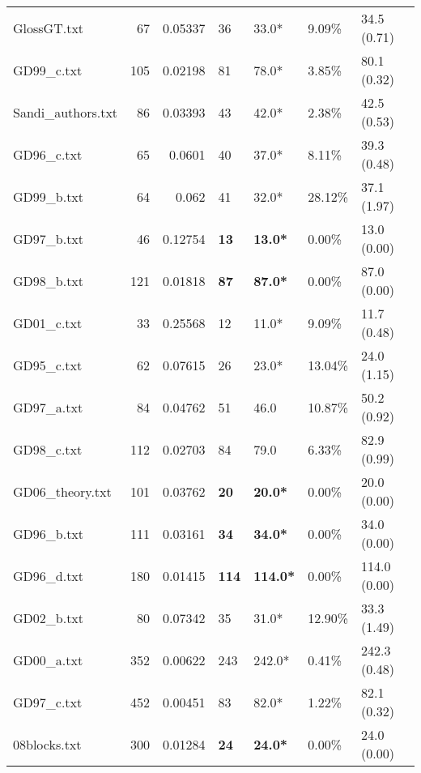 \begin{table}[h]
\begin{tabular}{lrrllll}
 GlossGT.txt        &      67 &     0.05337 & 36           & 33.0*           & 9.09\%   & 34.5 (0.71)    \\
 GD99_c.txt         &     105 &     0.02198 & 81           & 78.0*           & 3.85\%   & 80.1 (0.32)    \\
 Sandi_authors.txt  &      86 &     0.03393 & 43           & 42.0*           & 2.38\%   & 42.5 (0.53)    \\
 GD96_c.txt         &      65 &     0.0601  & 40           & 37.0*           & 8.11\%   & 39.3 (0.48)    \\
 GD99_b.txt         &      64 &     0.062   & 41           & 32.0*           & 28.12\%  & 37.1 (1.97)    \\
 GD97_b.txt         &      46 &     0.12754 & \textbf{13}  & \textbf{13.0*}  & 0.00\%   & 13.0 (0.00)    \\
 GD98_b.txt         &     121 &     0.01818 & \textbf{87}  & \textbf{87.0*}  & 0.00\%   & 87.0 (0.00)    \\
 GD01_c.txt         &      33 &     0.25568 & 12           & 11.0*           & 9.09\%   & 11.7 (0.48)    \\
 GD95_c.txt         &      62 &     0.07615 & 26           & 23.0*           & 13.04\%  & 24.0 (1.15)    \\
 GD97_a.txt         &      84 &     0.04762 & 51           & 46.0            & 10.87\%  & 50.2 (0.92)    \\
 GD98_c.txt         &     112 &     0.02703 & 84           & 79.0            & 6.33\%   & 82.9 (0.99)    \\
 GD06_theory.txt    &     101 &     0.03762 & \textbf{20}  & \textbf{20.0*}  & 0.00\%   & 20.0 (0.00)    \\
 GD96_b.txt         &     111 &     0.03161 & \textbf{34}  & \textbf{34.0*}  & 0.00\%   & 34.0 (0.00)    \\
 GD96_d.txt         &     180 &     0.01415 & \textbf{114} & \textbf{114.0*} & 0.00\%   & 114.0 (0.00)   \\
 GD02_b.txt         &      80 &     0.07342 & 35           & 31.0*           & 12.90\%  & 33.3 (1.49)    \\
 GD00_a.txt         &     352 &     0.00622 & 243          & 242.0*          & 0.41\%   & 242.3 (0.48)   \\
 GD97_c.txt         &     452 &     0.00451 & 83           & 82.0*           & 1.22\%   & 82.1 (0.32)    \\
 08blocks.txt       &     300 &     0.01284 & \textbf{24}  & \textbf{24.0*}  & 0.00\%   & 24.0 (0.00)    \\

\end{tabular}
\end{table}
